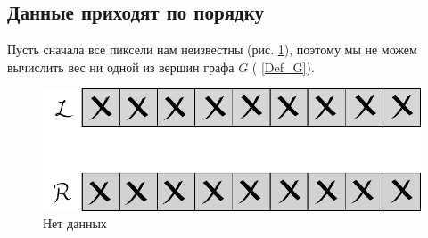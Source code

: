 \subsection{Данные приходят по порядку}
Пусть сначала все пиксели нам неизвестны (рис. \ref{1.4_im_nodata}), поэтому мы не можем вычислить вес ни одной из вершин графа $G$ ( \ref{Def_G}).
\begin{figure}[h!]
	\centering
	\includegraphics[scale = 0.7]{allclosed2.pdf}
	\caption{Нет данных}
	\label{1.4_im_nodata}
\end{figure}

